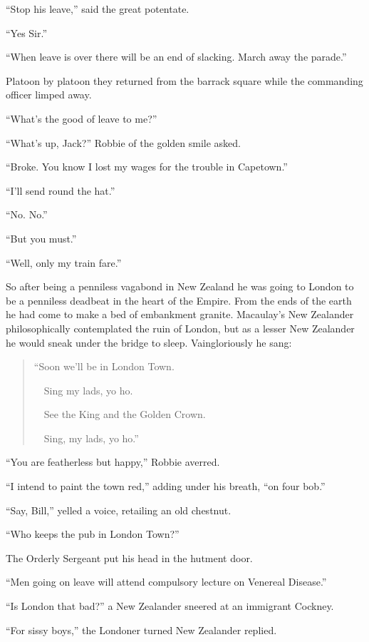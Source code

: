 ``Stop his leave,'' said the great potentate.

``Yes Sir.''

``When leave is over there will be an end of slacking. March away 
the parade.''

Platoon by platoon they returned from the barrack square while 
the commanding officer limped away.

``What's the good of leave to me?''

``What's up, Jack?'' Robbie of the golden smile asked.

``Broke. You know I lost my wages for the trouble in Capetown.''

``I'll send round the hat.''

``No. No.''

``But you must.''

``Well, only my train fare.''

So after being a penniless vagabond in New Zealand he was going 
to London to be a penniless deadbeat in the heart of the Empire. 
From the ends of the earth he had come to make a bed of embankment 
granite. Macaulay's New Zealander philosophically contemplated 
the ruin of London, but as a lesser New Zealander he would sneak 
under the bridge to sleep. Vaingloriously he sang:



\begin{verse}
``Soon we'll be in London Town.

\ \ Sing my lads, yo ho.

\ \ See the King and the Golden Crown.

\ \ Sing, my lads, yo ho.''
\end{verse}

``You are featherless but happy,'' Robbie averred.

``I intend to paint the town red,'' adding under his breath, 
``on four bob.''

``Say, Bill,'' yelled a voice, retailing an old chestnut.

``Who keeps the pub in London Town?''

The Orderly Sergeant put his head in the hutment door.

``Men going on leave will attend compulsory lecture on 
Venereal Disease.''

``Is London that bad?'' a New Zealander sneered at an 
immigrant Cockney.

``For sissy boys,'' the Londoner turned New Zealander 
replied.

